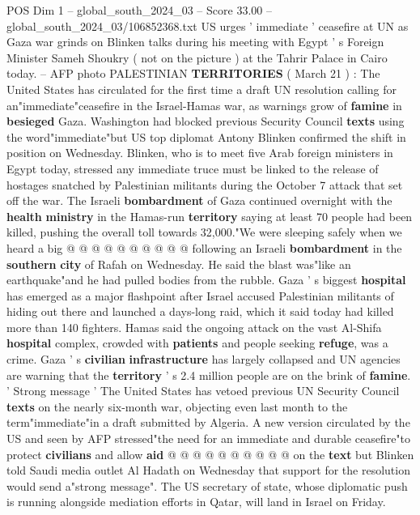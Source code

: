 \begin{textsample}{POS Dim 1 – global\_south\_2024\_03 – Score 33.00 – global\_south\_2024\_03/106852368.txt}  \label{ex:f1_pos_011}
US urges ' immediate ' ceasefire at UN as Gaza war grinds on Blinken talks during his meeting with Egypt ' s Foreign Minister Sameh Shoukry ( not on the picture ) at the Tahrir Palace in Cairo today. -- AFP photo PALESTINIAN \textbf{TERRITORIES} ( March 21 ) : The United States has circulated for the first time a draft UN resolution calling for an"immediate"ceasefire in the Israel-Hamas war, as warnings grow of \textbf{famine} in \textbf{besieged} Gaza.
Washington had blocked previous Security Council \textbf{texts} using the word"immediate"but US top diplomat Antony Blinken confirmed the shift in position on Wednesday.
Blinken, who is to meet five Arab foreign ministers in Egypt today, stressed any immediate truce must be linked to the release of hostages snatched by Palestinian militants during the October 7 attack that set off the war.
The Israeli \textbf{bombardment} of Gaza continued overnight with the \textbf{health} \textbf{ministry} in the Hamas-run \textbf{territory} saying at least 70 people had been killed, pushing the overall toll towards 32,000."We were sleeping safely when we heard a big @ @ @ @ @ @ @ @ @ @ following an Israeli \textbf{bombardment} in the \textbf{southern} \textbf{city} of Rafah on Wednesday.
He said the blast was"like an earthquake"and he had pulled bodies from the rubble.
Gaza ' s biggest \textbf{hospital} has emerged as a major flashpoint after Israel accused Palestinian militants of hiding out there and launched a days-long raid, which it said today had killed more than 140 fighters.
Hamas said the ongoing attack on the vast Al-Shifa \textbf{hospital} complex, crowded with \textbf{patients} and people seeking \textbf{refuge}, was a crime.
Gaza ' s \textbf{civilian} \textbf{infrastructure} has largely collapsed and UN agencies are warning that the \textbf{territory} ' s 2.4 million people are on the brink of \textbf{famine}. ' Strong message ' The United States has vetoed previous UN Security Council \textbf{texts} on the nearly six-month war, objecting even last month to the term"immediate"in a draft submitted by Algeria.
A new version circulated by the US and seen by AFP stressed"the need for an immediate and durable ceasefire"to protect \textbf{civilians} and allow \textbf{aid} @ @ @ @ @ @ @ @ @ @ on the \textbf{text} but Blinken told Saudi media outlet Al Hadath on Wednesday that support for the resolution would send a"strong message".
The US secretary of state, whose diplomatic push is running alongside mediation efforts in Qatar, will land in Israel on Friday.

\end{textsample}
